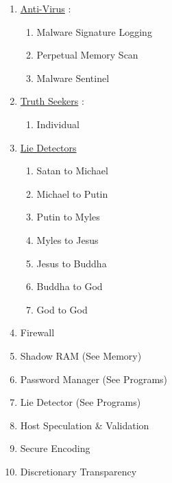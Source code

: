 \documentclass[11pt]{article}
\begin{document}
\begin{enumerate}
	\item[] \ul{Anti-Virus} :
	\begin{enumerate}
		\item[] Malware Signature Logging
		\item[] Perpetual Memory Scan
		\item[] Malware Sentinel
	\end{enumerate}

	\item[] \ul{Truth Seekers} :
	\begin{enumerate}
		\item[] Individual
	\end{enumerate}

	\item[] \ul{Lie Detectors}
	\begin{enumerate}
		\item[] Satan to Michael
		\item[] Michael to Putin
		\item[] Putin to Myles
		\item[] Myles to Jesus
		\item[] Jesus to Buddha
		\item[] Buddha to God
		\item[] God to God
	\end{enumerate}

	\item[] Firewall
	\item[] Shadow RAM (See Memory)
	\item[] Password Manager (See Programs)
	\item[] Lie Detector (See Programs)
	\item[] Host Speculation \& Validation
	\item[] Secure Encoding
	\item[] Discretionary Transparency
	
\end{enumerate}
\end{document}
